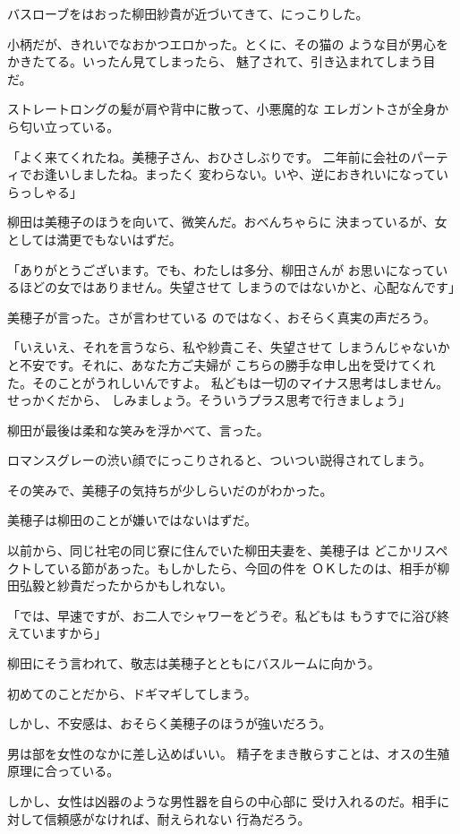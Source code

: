 ﻿\documentclass[
    book,tate,
    line_length=30zw,
    jafontsize=12pt,
    paper=b5j,
    landscape,
    ]{jlreq}
\begin{document}
バスローブをはおった柳田紗貴が近づいてきて、にっこりした。

小柄だが、きれいでなおかつエロかった。とくに、その猫の
ような目が男心をかきたてる。いったん見てしまったら、
魅了されて、引き込まれてしまう目だ。

ストレートロングの髪が肩や背中に散って、小悪魔的な
エレガントさが全身から匂い立っている。

「よく来てくれたね。美穂子さん、おひさしぶりです。
二年前に会社のパーティでお逢いしましたね。まったく
変わらない。いや、逆におきれいになっていらっしゃる」

柳田は美穂子のほうを向いて、微笑んだ。おべんちゃらに
決まっているが、女としては満更でもないはずだ。

「ありがとうございます。でも、わたしは多分、柳田さんが
お思いになっているほどの女ではありません。失望させて
しまうのではないかと、心配なんです」

美穂子が言った。さが言わせている
のではなく、おそらく真実の声だろう。

「いえいえ、それを言うなら、私や紗貴こそ、失望させて
しまうんじゃないかと不安です。それに、あなた方ご夫婦が
こちらの勝手な申し出を受けてくれた。そのことがうれしいんですよ。
私どもは一切のマイナス思考はしません。せっかくだから、
しみましょう。そういうプラス思考で行きましょう」

柳田が最後は柔和な笑みを浮かべて、言った。

ロマンスグレーの渋い顔でにっこりされると、ついつい説得されてしまう。

その笑みで、美穂子の気持ちが少しらいだのがわかった。

美穂子は柳田のことが嫌いではないはずだ。

以前から、同じ社宅の同じ寮に住んでいた柳田夫妻を、美穂子は
どこかリスペクトしている節があった。もしかしたら、今回の件を
ＯＫしたのは、相手が柳田弘毅と紗貴だったからかもしれない。

「では、早速ですが、お二人でシャワーをどうぞ。私どもは
もうすでに浴び終えていますから」

柳田にそう言われて、敬志は美穂子とともにバスルームに向かう。

初めてのことだから、ドギマギしてしまう。

しかし、不安感は、おそらく美穂子のほうが強いだろう。

男は部を女性のなかに差し込めばいい。
精子をまき散らすことは、オスの生殖原理に合っている。

しかし、女性は凶器のような男性器を自らの中心部に
受け入れるのだ。相手に対して信頼感がなければ、耐えられない
行為だろう。
\end{document}

